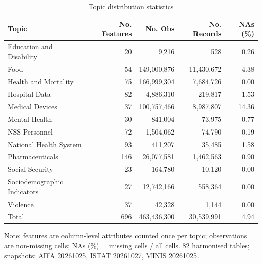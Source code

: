 \begin{table}[t]
\centering
\caption{Topic distribution statistics}
\label{tab:topic-stats}
\begin{tabular}{lrrrr}
\toprule
Topic & No. Features & No. Obs & No. Records & NAs (\%) \\
\midrule
Education and Disability & 20 & 9,216 & 528 & 0.26 \\
Food & 54 & 149,000,876 & 11,430,672 & 4.38 \\
Health and Mortality & 75 & 166,999,304 & 7,684,726 & 0.00 \\
Hospital Data & 82 & 4,886,310 & 219,817 & 1.53 \\
Medical Devices & 37 & 100,757,466 & 8,987,807 & 14.36 \\
Mental Health & 30 & 841,004 & 73,975 & 0.77 \\
NSS Personnel & 72 & 1,504,062 & 74,790 & 0.19 \\
National Health System & 93 & 411,207 & 35,485 & 1.58 \\
Pharmaceuticals & 146 & 26,077,581 & 1,462,563 & 0.90 \\
Social Security & 23 & 164,780 & 10,120 & 0.00 \\
Sociodemographic Indicators & 27 & 12,742,166 & 558,364 & 0.00 \\
Violence & 37 & 42,328 & 1,144 & 0.00 \\
\midrule
Total & 696 & 463,436,300 & 30,539,991 & 4.94 \\
\bottomrule
\end{tabular}
\par\smallskip\footnotesize Note: features are column-level attributes counted once per topic; observations are non-missing cells; NAs (\%) = missing cells / all cells. 82 harmonised tables; snapshots: AIFA 20261025, ISTAT 20261027, MINIS 20261025.
\end{table}
